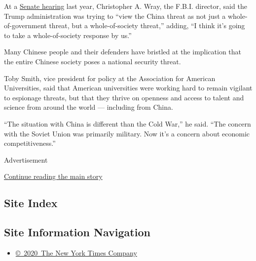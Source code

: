 At a
\href{https://www.intelligence.senate.gov/hearings/open-hearing-worldwide-threats-0}{Senate
hearing} last year, Christopher A. Wray, the F.B.I. director, said the
Trump administration was trying to ``view the China threat as not just a
whole-of-government threat, but a whole-of-society threat,'' adding, ``I
think it's going to take a whole-of-society response by us.''

Many Chinese people and their defenders have bristled at the implication
that the entire Chinese society poses a national security threat.

Toby Smith, vice president for policy at the Association for American
Universities, said that American universities were working hard to
remain vigilant to espionage threats, but that they thrive on openness
and access to talent and science from around the world --- including
from China.

``The situation with China is different than the Cold War,'' he said.
``The concern with the Soviet Union was primarily military. Now it's a
concern about economic competitiveness.''

Advertisement

\protect\hyperlink{after-bottom}{Continue reading the main story}

\hypertarget{site-index}{%
\subsection{Site Index}\label{site-index}}

\hypertarget{site-information-navigation}{%
\subsection{Site Information
Navigation}\label{site-information-navigation}}

\begin{itemize}
\tightlist
\item
  \href{https://help.nytimes.com/hc/en-us/articles/115014792127-Copyright-notice}{©~2020~The
  New York Times Company}
\end{itemize}

